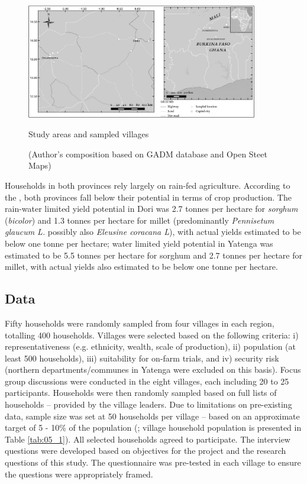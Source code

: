 \begin{figure}
  \includegraphics[width=0.9\textwidth]{figs_05/image1.png}
  \captionsetup{singlelinecheck = false, justification=justified}
  \caption{Study areas and sampled villages}
  \label{map:05_1}
  \vspace*{-3mm}
  \caption*{(Author's composition based on GADM database and Open Steet Maps)}
\end{figure}



Households in both provinces rely largely on rain-fed agriculture. According to the \citet{GlobalYieldGapAtlas2016}, both provinces fall below their potential in terms of crop production. The rain-water limited yield potential in Dori was 2.7 tonnes per hectare for \textit{sorghum} (\textit{bicolor}) and 1.3 tonnes per hectare for millet (predominantly \textit{Pennisetum glaucum L.} possibly also \textit{Eleusine coracana L}), with actual yields estimated to be below one tonne per hectare; water limited yield potential in Yatenga was estimated to be 5.5 tonnes per hectare for sorghum and 2.7 tonnes per hectare for millet, with actual yields also estimated to be below one tonne per hectare.

\subsection{Data}

Fifty households were randomly sampled from four villages in each region, totalling 400 households. Villages were selected based on the following criteria: i) representativeness (e.g. ethnicity, wealth, scale of production), ii) population (at least 500 households), iii) suitability for on-farm trials, and iv) security risk (northern departments/communes in Yatenga were excluded on this basis). Focus group discussions were conducted in the eight villages, each including 20 to 25 participants. Households were then randomly sampled based on full lists of households -- provided by the village leaders. Due to limitations on pre-existing data, sample size was set at 50 households per village -- based on an approximate target of 5 - 10\% of the population (\citealp{Lapan2011}; village household population is presented in Table \ref{tab:05_1}). All selected households agreed to participate. The interview questions were developed based on objectives for the project and the research questions of this study. The questionnaire was pre-tested in each village to ensure the questions were appropriately framed.

